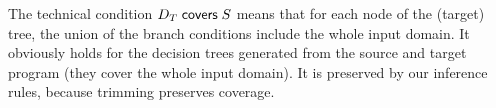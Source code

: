 \documentclass[12pt]{article}
\begin{document}
The technical condition $D_T \mathrel{\mathsf{covers}} S$ means that for each node of the (target) tree, the union of the branch conditions include the whole input domain. It obviously holds for the decision trees generated from the source and target program (they cover the whole input domain). It is preserved by our inference rules, because trimming preserves coverage.
\end{document}
